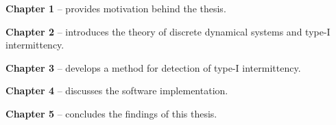 \begin{description}
	\item \textbf{Chapter 1} -- provides motivation behind the thesis.
	\item \textbf{Chapter 2} -- introduces the theory of discrete dynamical systems and type-I intermittency.
	\item \textbf{Chapter 3} -- develops a method for detection of type-I intermittency.
	\item \textbf{Chapter 4} -- discusses the software implementation.
	\item \textbf{Chapter 5} -- concludes the findings of this thesis.
\end{description}

\endinput